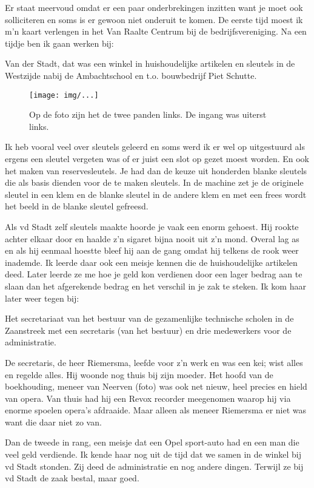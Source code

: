 \documentclass[10pt,twoside,openright]{memoir}
\begin{document}
Er staat meervoud omdat er een paar onderbrekingen inzitten want je moet ook solliciteren en soms is er gewoon niet onderuit te komen. De eerste tijd moest ik m'n kaart verlengen in het Van Raalte Centrum bij de bedrijfsvereniging. Na een tijdje ben ik gaan werken bij:

Van der Stadt, dat was een winkel in huishoudelijke artikelen en sleutels in de Westzijde nabij de Ambachtschool en t.o. bouwbedrijf Piet Schutte.

\begin{figure}[t]
\texttt{[image: img/...]}
\caption{Op de foto zijn het de twee panden links. De ingang was uiterst links.}
\end{figure}

Ik heb vooral veel over sleutels geleerd en soms werd ik er wel op uitgestuurd als ergens een sleutel vergeten was of er juist een slot op gezet moest worden. En ook het maken van reservesleutels. Je had dan de keuze uit honderden blanke sleutels die als basis dienden voor de te maken sleutels. In de machine zet je de originele sleutel in een klem en de blanke sleutel in de andere klem en met een frees wordt het beeld in de blanke sleutel gefreesd. 

Als vd Stadt zelf sleutels maakte hoorde je vaak een enorm gehoest. Hij rookte achter elkaar door en haalde z’n sigaret bijna nooit uit z’n mond. Overal lag as en als hij eenmaal hoestte bleef hij aan de gang omdat hij telkens de rook weer inademde. Ik leerde daar ook een meisje kennen die de huishoudelijke artikelen deed. Later leerde ze me hoe je geld kon verdienen door een lager bedrag aan te slaan dan het afgerekende bedrag en het verschil in je zak te steken. Ik kom haar later weer tegen bij: 

Het secretariaat van het bestuur van de gezamenlijke technische scholen in de Zaanstreek met een secretaris (van het bestuur) en drie medewerkers voor de administratie. 

De secretaris, de heer Riemersma, leefde voor z'n werk en was een kei; wist alles en regelde alles. Hij woonde nog thuis bij zijn moeder. Het hoofd van de boekhouding, meneer van Neerven (foto) was ook net nieuw, heel precies en hield van opera. Van thuis had hij een Revox recorder meegenomen waarop hij via enorme spoelen opera's afdraaide. Maar alleen als meneer Riemersma er niet was want die daar niet zo van.

Dan de tweede in rang, een meisje dat een Opel sport-auto had en een man die veel geld verdiende. Ik kende haar nog uit de tijd dat we samen in de winkel bij vd Stadt stonden. Zij deed de administratie en nog andere dingen. Terwijl ze bij vd Stadt de zaak bestal, maar goed.
\end{document}
